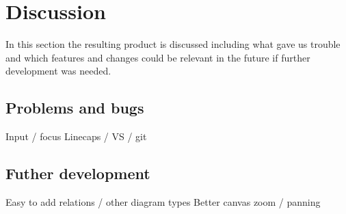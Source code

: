 \section{Discussion}
In this section the resulting product is discussed including what gave us trouble and
which features and changes could be relevant in the future if further
development was needed.

\subsection{Problems and bugs}
Input / focus
Linecaps / VS / git

\subsection{Futher development}
Easy to add relations / other diagram types
Better canvas zoom / panning
